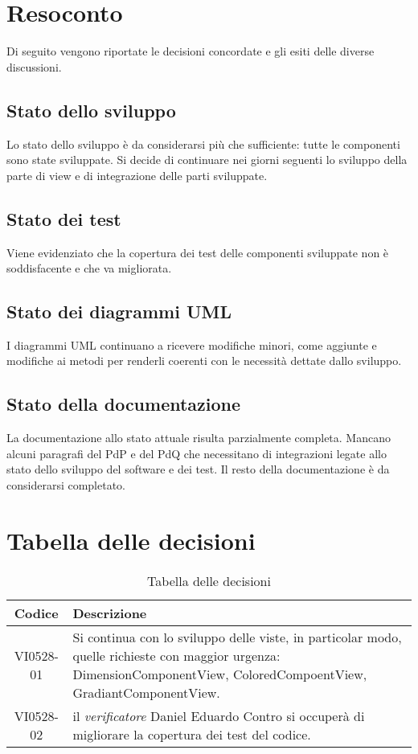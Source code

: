 \documentclass{article}
\begin{document}
\newpage
\section{Resoconto}
\label{sec:resoconto}

Di seguito vengono riportate le decisioni concordate e gli esiti delle diverse discussioni.

\subsection{Stato dello sviluppo}
\label{itm:1}

Lo stato dello sviluppo è da considerarsi più che sufficiente: tutte le componenti sono state sviluppate.  Si decide di continuare nei giorni seguenti lo sviluppo della parte di view e di integrazione delle parti sviluppate. 

\subsection{Stato dei test}
\label{itm:2}
Viene evidenziato che la copertura dei test delle componenti sviluppate non è soddisfacente e che va migliorata.

\subsection{Stato dei diagrammi UML}
\label{itm:2}
I diagrammi UML continuano a ricevere modifiche minori, come aggiunte e modifiche ai metodi per renderli coerenti con le necessità dettate dallo sviluppo.

\subsection{Stato della documentazione}
\label{itm:2}
La documentazione allo stato attuale risulta parzialmente completa. Mancano alcuni paragrafi del PdP e del PdQ che necessitano di integrazioni legate allo stato dello sviluppo del software e dei test. Il resto della documentazione è da considerarsi completato.

\section{Tabella delle decisioni}%
\label{sub:decisioni}

\begin{table}[!ht]
	\centering
	\begin{tabular}{|c|p{13cm}|}
		\hline
		\rowcolor{lightgray}
		\textbf{Codice} & \textbf{Descrizione} \\
		\hline
			VI0528-01 & Si continua con lo sviluppo delle viste, in particolar modo, quelle richieste con maggior urgenza: DimensionComponentView, ColoredCompoentView, GradiantComponentView. \\
            VI0528-02 & il \emph{verificatore} Daniel Eduardo Contro si occuperà di migliorare la copertura dei test del codice. \\
		\hline
	\end{tabular}
	\caption{Tabella delle decisioni}
\end{table}
\end{document}
